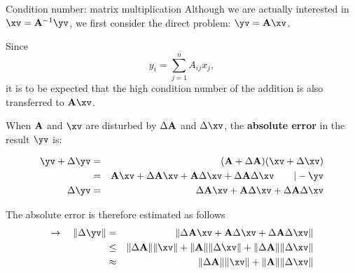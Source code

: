 






\begin{vbframe}{Condition number: matrix multiplication}
Although we are actually interested in $\xv = \Amat^{-1}\yv$, we first consider the direct problem: $\yv = \Amat \xv$.

\lz

Since
$$
y_i = \sum_{j = 1}^n A_{ij}x_j,
$$
it is to be expected that the high condition number of the addition is also transferred to $\Amat \xv$.

\framebreak

When $\mathbf{A}$ and $\xv$ are disturbed by $\Delta \mathbf{A}$ and $\Delta \xv$, the \textbf{absolute error} in the result $\yv$ is:

\begin{eqnarray*}
\yv + \Delta \yv &=& (\Amat + \Delta \Amat)(
  \xv + \Delta \xv)\\  &=& \Amat \xv + \Delta \Amat\xv + \Amat\Delta \xv +
      \Delta \Amat\Delta \xv \qquad | - \yv \\
\Delta \yv &=& \Delta \Amat\xv + \Amat\Delta \xv +
      \Delta \Amat\Delta \xv
\end{eqnarray*}

The absolute error is therefore estimated as follows
\begin{eqnarray*}
\to \quad \|\Delta \yv\| &=& \|\Delta \Amat\xv + \Amat\Delta \xv +
      \Delta \Amat\Delta \xv\| \\ &\le& \|\Delta \Amat\|\|\xv\| + \|\Amat\|\|\Delta \xv\| +
      \|\Delta \Amat\|\|\Delta \xv\| \\
      &\approx& \|\Delta \Amat\|\|\xv\| + \|\Amat\|\|\Delta \xv\|
\end{eqnarray*}

%


\end{vbframe}
